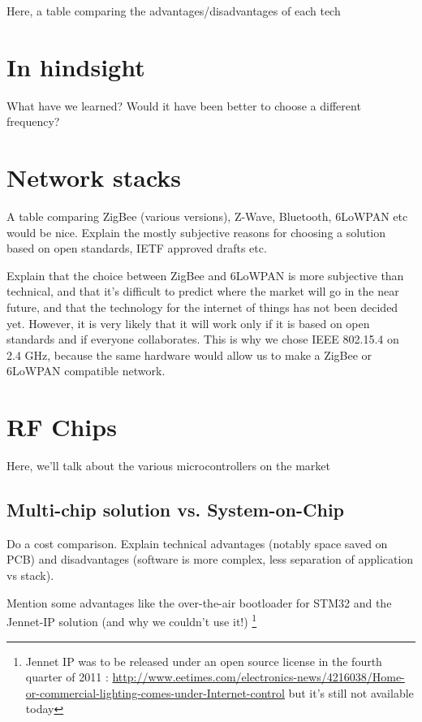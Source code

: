 Here, a table comparing the advantages/disadvantages of each tech

\section{In hindsight}

What have we learned? Would it have been better to choose a different frequency?

\section{Network stacks}\label{sec:stacks}

A table comparing ZigBee (various versions), Z-Wave, Bluetooth, 6LoWPAN etc
would be nice.
Explain the mostly subjective reasons for choosing a solution based on open
standards, IETF approved drafts etc. 

Explain that the choice between ZigBee and 6LoWPAN is more subjective than
technical, and that it's difficult to predict where the market will go in the
near future, and that the technology for the internet of things has not been
decided yet. However, it is very likely that it will work only if it is based on
open standards and if everyone collaborates. This is why we chose IEEE 802.15.4
on 2.4 GHz, because the same hardware would allow us to make a ZigBee or 6LoWPAN
compatible network.

\section{RF Chips}\label{sec:chips}

Here, we'll talk about the various microcontrollers on the market

\subsection{Multi-chip solution vs. System-on-Chip}

Do a cost comparison. 
Explain technical advantages (notably space saved on PCB) and disadvantages
(software is more complex, less separation of application vs stack).

Mention some advantages like the over-the-air bootloader for STM32 and the
Jennet-IP solution (and why we couldn't use it!) \footnote{Jennet IP was to be
released under an open source license in the fourth quarter of 2011
: \url{http://www.eetimes.com/electronics-news/4216038/Home-or-commercial-lighting-comes-under-Internet-control}
but it's still not available today}

